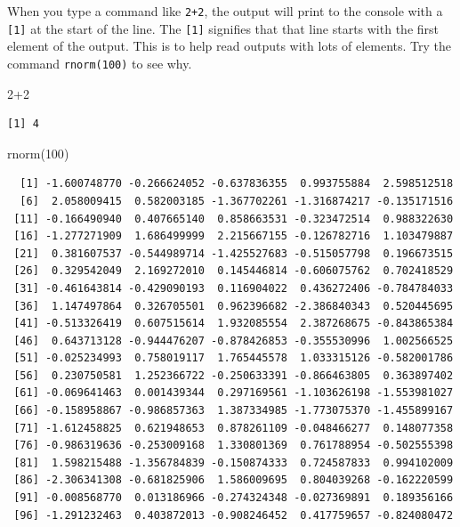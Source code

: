 \documentclass[
  13,
  letterpaper,
]{report}
\newenvironment{Shaded}{\begin{snugshade}}{\end{snugshade}}
\newcommand{\DecValTok}[1]{\textcolor[rgb]{0.68,0.00,0.00}{#1}}
\newcommand{\FunctionTok}[1]{\textcolor[rgb]{0.28,0.35,0.67}{#1}}
\newcommand{\NormalTok}[1]{\textcolor[rgb]{0.00,0.23,0.31}{#1}}
\newcommand{\SpecialCharTok}[1]{\textcolor[rgb]{0.37,0.37,0.37}{#1}}
\begin{document}
When you type a command like \texttt{2+2}, the output will print to the
console with a \texttt{{[}1{]}} at the start of the line. The
\texttt{{[}1{]}} signifies that that line starts with the first element
of the output. This is to help read outputs with lots of elements. Try
the command \texttt{rnorm(100)} to see why.

\begin{Shaded}
\begin{Highlighting}[]
\DecValTok{2}\SpecialCharTok{+}\DecValTok{2}
\end{Highlighting}
\end{Shaded}

\begin{verbatim}
[1] 4
\end{verbatim}

\begin{Shaded}
\begin{Highlighting}[]
\FunctionTok{rnorm}\NormalTok{(}\DecValTok{100}\NormalTok{)}
\end{Highlighting}
\end{Shaded}

\begin{verbatim}
  [1] -1.600748770 -0.266624052 -0.637836355  0.993755884  2.598512518
  [6]  2.058009415  0.582003185 -1.367702261 -1.316874217 -0.135171516
 [11] -0.166490940  0.407665140  0.858663531 -0.323472514  0.988322630
 [16] -1.277271909  1.686499999  2.215667155 -0.126782716  1.103479887
 [21]  0.381607537 -0.544989714 -1.425527683 -0.515057798  0.196673515
 [26]  0.329542049  2.169272010  0.145446814 -0.606075762  0.702418529
 [31] -0.461643814 -0.429090193  0.116904022  0.436272406 -0.784784033
 [36]  1.147497864  0.326705501  0.962396682 -2.386840343  0.520445695
 [41] -0.513326419  0.607515614  1.932085554  2.387268675 -0.843865384
 [46]  0.643713128 -0.944476207 -0.878426853 -0.355530996  1.002566525
 [51] -0.025234993  0.758019117  1.765445578  1.033315126 -0.582001786
 [56]  0.230750581  1.252366722 -0.250633391 -0.866463805  0.363897402
 [61] -0.069641463  0.001439344  0.297169561 -1.103626198 -1.553981027
 [66] -0.158958867 -0.986857363  1.387334985 -1.773075370 -1.455899167
 [71] -1.612458825  0.621948653  0.878261109 -0.048466277  0.148077358
 [76] -0.986319636 -0.253009168  1.330801369  0.761788954 -0.502555398
 [81]  1.598215488 -1.356784839 -0.150874333  0.724587833  0.994102009
 [86] -2.306341308 -0.681825906  1.586009695  0.804039268 -0.162220599
 [91] -0.008568770  0.013186966 -0.274324348 -0.027369891  0.189356166
 [96] -1.291232463  0.403872013 -0.908246452  0.417759657 -0.824080472
\end{verbatim}
\end{document}
